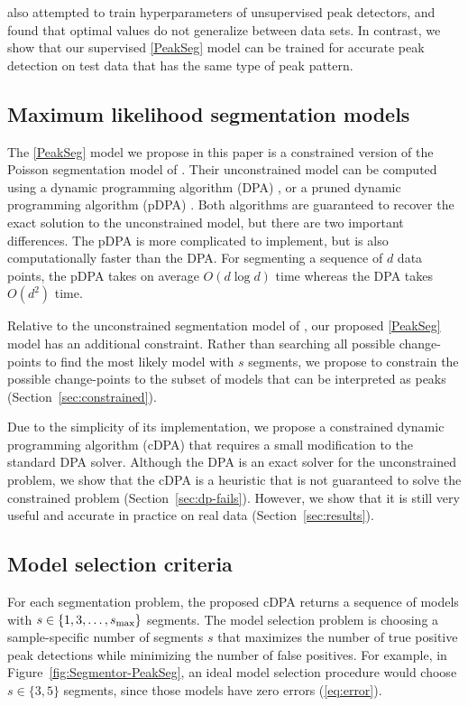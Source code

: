 \documentclass{article}
\begin{document}
\citet{DFilter} also attempted to train hyperparameters of
unsupervised peak detectors, and \citet{picking2012} found that
optimal values do not generalize between data sets. In contrast, we
show that our supervised \ref{PeakSeg} model can be trained for
accurate peak detection on test data that has the same type of peak
pattern.

\subsection{Maximum likelihood segmentation models}

The \ref{PeakSeg} model we propose in this paper is a constrained
version of the Poisson segmentation model of \citet{Segmentor}.
Their unconstrained model can be computed using a dynamic programming
algorithm (DPA) \citep{bellman}, or a pruned dynamic programming
algorithm (pDPA) \citep{pruned-dp}. Both algorithms are guaranteed to
recover the exact solution to the unconstrained model, but there are
two important differences. The pDPA is more complicated to implement,
but is also computationally faster than the DPA. For segmenting a
sequence of $d$ data points, the pDPA takes on average $O(d\log d)$
time whereas the DPA takes $O(d^2)$ time. 

Relative to the unconstrained segmentation model of \citet{Segmentor},
our proposed \ref{PeakSeg} model has an additional constraint. Rather
than searching all possible change-points to find the most likely
model with $s$ segments, we propose to constrain the possible
change-points to the subset of models that can be interpreted as peaks
(Section~\ref{sec:constrained}).

Due to the simplicity of its implementation, we propose a constrained
dynamic programming algorithm (cDPA) that requires a small
modification to the standard DPA solver. Although the DPA is an exact
solver for the unconstrained problem, we show that the cDPA is a
heuristic that is not guaranteed to solve the constrained
problem (Section~\ref{sec:dp-fails}). However, we show that it is
still very useful and accurate in practice on real data
(Section~\ref{sec:results}).

\subsection{Model selection criteria}

For each segmentation problem, the proposed cDPA returns a sequence of
models with $s\in\{1, 3, \dots, s_{\text{\text{max}}}\}$ segments. The
model selection problem is choosing a sample-specific number of
segments $s$ that maximizes the number of true positive peak
detections while minimizing the number of false positives. For
example, in Figure~\ref{fig:Segmentor-PeakSeg}, an ideal model
selection procedure would choose $s\in\{3, 5\}$ segments, since those
models have zero errors (\ref{eq:error}).
\end{document}
